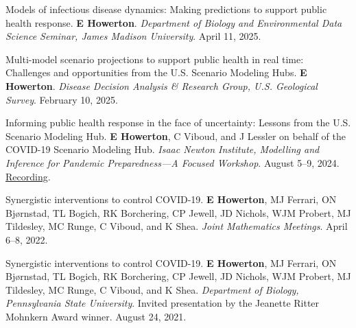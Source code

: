 
\begin{cvnumbered}
  \item Models of infectious disease dynamics: Making predictions to support public health response. \textbf{E Howerton\cvstar}. \textit{Department of Biology and Environmental Data Science Seminar, James Madison University}. April 11, 2025.

  \item Multi-model scenario projections to support public health in real time: Challenges and opportunities from the U.S. Scenario Modeling Hubs. \textbf{E Howerton\cvstar}. \textit{Disease Decision Analysis \& Research Group, U.S. Geological Survey}. February 10, 2025.

  \item Informing public health response in the face of uncertainty: Lessons from the U.S. Scenario Modeling Hub. \textbf{E Howerton\cvstar}, C Viboud, and J Lessler on behalf of the COVID-19 Scenario Modeling Hub. \textit{Isaac Newton Institute, Modelling and Inference for Pandemic Preparedness---A Focused Workshop}. August 5--9, 2024. \href{https://www.youtube.com/watch?v=BSKv0QbDhoc}{Recording}.

  \item Synergistic interventions to control COVID-19. \textbf{E Howerton\cvstar}, MJ Ferrari, ON Bjørnstad, TL Bogich, RK Borchering, CP Jewell, JD Nichols, WJM Probert, MJ Tildesley, MC Runge, C Viboud, and K Shea. \textit{Joint Mathematics Meetings}. April 6--8, 2022.

  \item Synergistic interventions to control COVID-19. \textbf{E Howerton\cvstar}, MJ Ferrari, ON Bjørnstad, TL Bogich, RK Borchering, CP Jewell, JD Nichols, WJM Probert, MJ Tildesley, MC Runge, C Viboud, and K Shea. \textit{Department of Biology, Pennsylvania State University}. Invited presentation by the Jeanette Ritter Mohnkern Award winner. August 24, 2021.
\end{cvnumbered}

